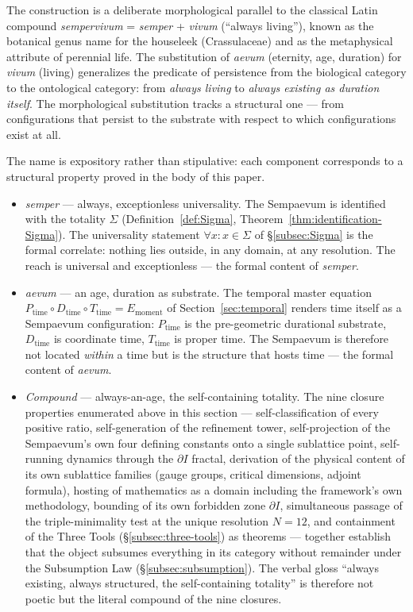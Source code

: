 \documentclass[11pt,a4paper]{article}
\theoremstyle{definition}
\theoremstyle{remark}
\begin{document}
The construction is a deliberate morphological parallel to the classical Latin compound \emph{sempervivum} = \emph{semper} + \emph{vivum} (``always living''), known as the botanical genus name for the houseleek (Crassulaceae) and as the metaphysical attribute of perennial life. The substitution of \emph{aevum} (eternity, age, duration) for \emph{vivum} (living) generalizes the predicate of persistence from the biological category to the ontological category: from \emph{always living} to \emph{always existing as duration itself}. The morphological substitution tracks a structural one --- from configurations that persist to the substrate with respect to which configurations exist at all.

The name is expository rather than stipulative: each component corresponds to a structural property proved in the body of this paper.

\begin{itemize}[leftmargin=*]
\item \emph{semper} --- always, exceptionless universality. The Sempaevum is identified with the totality $\Sigma$ (Definition~\ref{def:Sigma}, Theorem~\ref{thm:identification-Sigma}). The universality statement $\forall x : x \in \Sigma$ of \S\ref{subsec:Sigma} is the formal correlate: nothing lies outside, in any domain, at any resolution. The reach is universal and exceptionless --- the formal content of \emph{semper}.

\item \emph{aevum} --- an age, duration as substrate. The temporal master equation $P_{\text{time}} \circ D_{\text{time}} \circ T_{\text{time}} = E_{\text{moment}}$ of Section~\ref{sec:temporal} renders time itself as a Sempaevum configuration: $P_{\text{time}}$ is the pre-geometric durational substrate, $D_{\text{time}}$ is coordinate time, $T_{\text{time}}$ is proper time. The Sempaevum is therefore not located \emph{within} a time but is the structure that hosts time --- the formal content of \emph{aevum}.

\item \emph{Compound} --- always-an-age, the self-containing totality. The nine closure properties enumerated above in this section --- self-classification of every positive ratio, self-generation of the refinement tower, self-projection of the Sempaevum's own four defining constants onto a single sublattice point, self-running dynamics through the $\partial I$ fractal, derivation of the physical content of its own sublattice families (gauge groups, critical dimensions, adjoint formula), hosting of mathematics as a domain including the framework's own methodology, bounding of its own forbidden zone $\partial I$, simultaneous passage of the triple-minimality test at the unique resolution $N=12$, and containment of the Three Tools (\S\ref{subsec:three-tools}) as theorems --- together establish that the object subsumes everything in its category without remainder under the Subsumption Law (\S\ref{subsec:subsumption}). The verbal gloss ``always existing, always structured, the self-containing totality'' is therefore not poetic but the literal compound of the nine closures.
\end{itemize}
\end{document}
